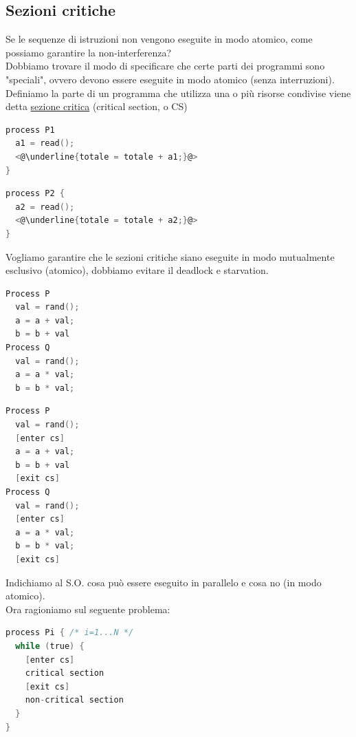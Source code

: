 \documentclass[a4paper,12pt]{article}
\begin{document}
\subsection{Sezioni critiche}
Se le sequenze di istruzioni non vengono eseguite in modo atomico, come possiamo garantire la non-interferenza? \\
Dobbiamo trovare il modo di specificare che certe parti dei programmi sono "speciali", ovvero devono essere eseguite in modo atomico (senza interruzioni). \\
Definiamo la parte di un programma che utilizza una o più risorse condivise viene detta \underline{sezione critica} (critical section, o CS) \\
\begin{minipage}{0.48\textwidth}
\begin{lstlisting}[language=C]
process P1
  a1 = read();
  <@\underline{totale = totale + a1;}@>
}
\end{lstlisting}
\end{minipage}
\hfill
\begin{minipage}{0.48\textwidth}
\begin{lstlisting}[language=C]
process P2 {
  a2 = read();
  <@\underline{totale = totale + a2;}@>
}
\end{lstlisting}
\end{minipage}
Vogliamo garantire che le sezioni critiche siano eseguite in modo mutualmente esclusivo (atomico), dobbiamo evitare il deadlock e starvation. \\
\begin{minipage}{0.48\textwidth}
\begin{lstlisting}[language=C]
Process P
  val = rand();
  a = a + val;
  b = b + val
Process Q
  val = rand();
  a = a * val;
  b = b * val;
\end{lstlisting}
\end{minipage}
\hfill 
\begin{minipage}{0.48\textwidth}
\begin{lstlisting}[language=C]
Process P
  val = rand();
  [enter cs]
  a = a + val;
  b = b + val
  [exit cs]
Process Q
  val = rand();
  [enter cs]
  a = a * val;
  b = b * val;
  [exit cs]
\end{lstlisting}
\end{minipage}
Indichiamo al S.O. cosa può essere eseguito in parallelo e cosa no (in modo atomico).
\vspace{2em} \\
Ora ragioniamo sul seguente problema:
\begin{lstlisting}[language=C]
process Pi { /* i=1...N */
  while (true) {
    [enter cs]
    critical section
    [exit cs]
    non-critical section
  }
}
\end{lstlisting}
\end{document}
